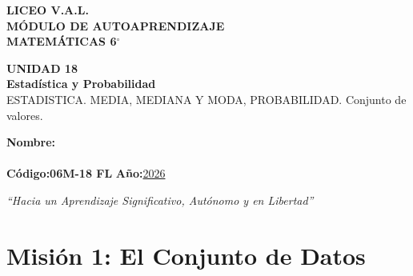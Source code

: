 \documentclass[12pt, letterpaper]{article}
\begin{document}
	
	\begin{center}
		{\Huge\textbf{LICEO V.A.L.}}\\[0.5cm]
		{\LARGE\textbf{MÓDULO DE AUTOAPRENDIZAJE}}\\[0.5cm]
		{\Large\textbf{MATEMÁTICAS 6$^\circ$}}\\[0.5cm]
		\begin{tcolorbox}[colback=valblue!10, colframe=valblue,
			arc=3mm, boxrule=1.5pt]
			\centering
			\Huge\textbf{UNIDAD 18}\\[0.2cm]
			\Large\textbf{Estadística y Probabilidad}\\[0.2cm]
			\large ESTADISTICA. MEDIA, MEDIANA Y MODA, PROBABILIDAD. Conjunto de valores.
		\end{tcolorbox}
		\begin{tcolorbox}[colback=white, colframe=valblue,
			width=12cm, arc=3mm, boxrule=1.5pt]
			\centering%
			\textbf{Nombre:}\\[0.3cm]
			\underline{\hspace{9cm}}\\[0.5cm]
			\textbf{Código:}\;\textbf{06M-18 FL}
			\hspace{1cm}\textbf{Año:}\;\underline{2026}
		\end{tcolorbox}
		\textit{``Hacia un Aprendizaje Significativo, Autónomo y en Libertad''}
	\end{center}
	\section*{Misión 1: El Conjunto de Datos}
	
\end{document}
